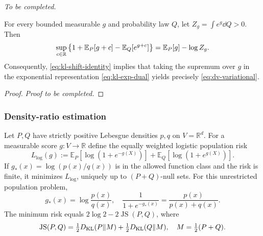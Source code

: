 \documentclass[12pt,a4paper,oneside]{book}
\begin{document}
\noindent\textit{To be completed.}
\begin{proposition}
\label{prop:kl-shift-duality}
\label{src:p11q11}
For every bounded measurable $g$ and probability law $Q$, let
$Z_g=\int e^g\dd Q>0$. Then
\begin{equation}
 \sup_{c\in\mathbb{R}}\left\{
 1+\mathbb E_P[g+c]-\mathbb E_Q[e^{g+c}]
 \right\}
 =\mathbb E_P[g]-\log Z_g.
\label{eq:kl-shift-identity}
\end{equation}
Consequently, \eqref{eq:kl-shift-identity} implies that taking the supremum over $g$ in the
exponential representation \eqref{eq:kl-exp-dual} yields precisely
\eqref{eq:dv-variational}.
\end{proposition}


\begin{proof}
\noindent\textit{Proof to be completed.}
\end{proof}



\subsubsection{Density-ratio estimation}
\begin{theorem}
\label{thm:logistic-ratio}
\label{src:p11q12}
Let $P,Q$ have strictly positive Lebesgue densities $p,q$ on $V=\mathbb R^d$. For a measurable score $g:V\to\mathbb R$ define 
the equally weighted logistic population risk
\begin{equation*}
    L_{\mathrm{log}}(g):=\mathbb E_P[\log(1+e^{-g(X)})] + \mathbb E_Q[\log(1+e^{g(X)})].
\end{equation*}
If $g_*(x)=\log(p(x)/q(x))$ is in the allowed function class and the risk is finite, it minimizes $L_{\mathrm{log}}$, uniquely 
up to $(P+Q)$-null sets. For this unrestricted population problem,
\begin{equation*}
    g_*(x)=\log\frac{p(x)}{q(x)},\quad \frac{1}{1+e^{-g_*(x)}}=\frac{p(x)}{p(x)+q(x)}.
\end{equation*}
The minimum risk equals $2\log2-2\operatorname{JS}(P,Q)$, where
\begin{equation*}
    \operatorname{JS}(P,Q)=\tfrac12D_{\mathrm{KL}}(P\Vert M) + \tfrac12D_{\mathrm{KL}}(Q\Vert M), \quad M=\tfrac12(P+Q).
\end{equation*}
\end{theorem}
\end{document}
